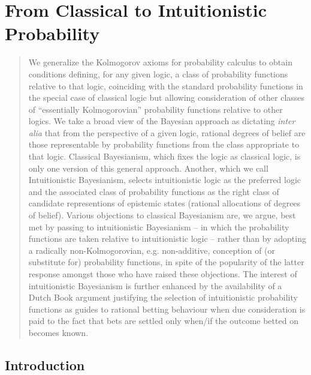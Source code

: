 \chapter{From Classical to Intuitionistic Probability}


\begin{quote}
\noindent We generalize the Kolmogorov axioms for probability calculus to obtain conditions defining, for any given logic, a class of probability functions relative to that logic, coinciding with the standard probability functions in the special case of classical logic but allowing consideration of other classes of ``essentially Kolmogorovian'' probability functions relative to other logics. We take a broad view of the Bayesian approach as dictating \textit{inter alia} that from the perspective of a given logic, rational degrees of belief are those representable by probability functions from the class appropriate to that logic. Classical Bayesianism, which fixes the logic as classical logic, is only one version of this general approach. Another, which we call Intuitionistic Bayesianism, selects intuitionistic logic as the preferred logic and the associated class of probability functions as the right class of candidate representions of epistemic states (rational allocations of degrees of belief). Various objections to classical Bayesianism are, we argue, best met by passing to intuitionistic Bayesianism -- in which the probability functions are taken relative to intuitionistic logic -- rather than by adopting a radically non-Kolmogorovian, e.g. non-additive, conception of (or substitute for) probability functions, in spite of the popularity of the latter response amongst those who have raised these objections. The interest of intuitionistic Bayesianism is further enhanced by the availability of a Dutch Book argument justifying the selection of intuitionistic probability functions as guides to rational betting behaviour when due consideration is paid to the fact that bets are settled only when/if the outcome betted on becomes known.
\end{quote}

\section{Introduction}

